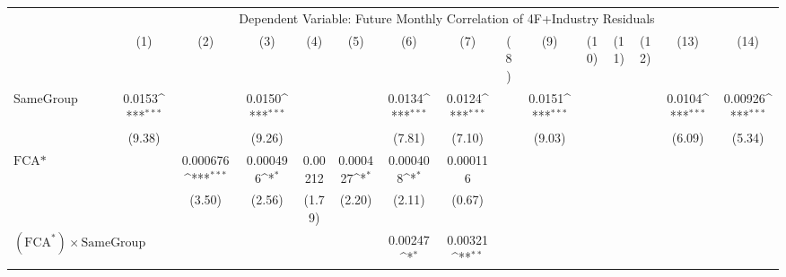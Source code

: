 {
\def\sym#1{\ifmmode^{#1}\else\(^{#1}\)\fi}
\begin{tabular}{l*{14}{c}}
\hline\hline
                &\multicolumn{14}{c}{Dependent Variable: Future Monthly Correlation of 4F+Industry Residuals}                                                                                                                                                                             \\\cmidrule(lr){2-15}
                &\multicolumn{1}{c}{(1)}         &\multicolumn{1}{c}{(2)}         &\multicolumn{1}{c}{(3)}         &\multicolumn{1}{c}{(4)}         &\multicolumn{1}{c}{(5)}         &\multicolumn{1}{c}{(6)}         &\multicolumn{1}{c}{(7)}         &\multicolumn{1}{c}{(8)}         &\multicolumn{1}{c}{(9)}         &\multicolumn{1}{c}{(10)}         &\multicolumn{1}{c}{(11)}         &\multicolumn{1}{c}{(12)}         &\multicolumn{1}{c}{(13)}         &\multicolumn{1}{c}{(14)}         \\
\hline
SameGroup       &   0.0153\sym{***}&                  &   0.0150\sym{***}&                  &                  &   0.0134\sym{***}&   0.0124\sym{***}&                  &   0.0151\sym{***}&                  &                  &                  &   0.0104\sym{***}&  0.00926\sym{***}\\
                &   (9.38)         &                  &   (9.26)         &                  &                  &   (7.81)         &   (7.10)         &                  &   (9.03)         &                  &                  &                  &   (6.09)         &   (5.34)         \\
[1em]
$ \text{FCA*} $ &                  & 0.000676\sym{***}& 0.000496\sym{*}  &  0.00212         & 0.000427\sym{*}  & 0.000408\sym{*}  & 0.000116         &                  &                  &                  &                  &                  &                  &                  \\
                &                  &   (3.50)         &   (2.56)         &   (1.79)         &   (2.20)         &   (2.11)         &   (0.67)         &                  &                  &                  &                  &                  &                  &                  \\
[1em]
 $ (\text{FCA}^*) \times {\text{SameGroup} }  $ &                  &                  &                  &                  &                  &  0.00247\sym{*}  &  0.00321\sym{**} &                  &                  &                  &                  &                  &                  &                  \\

\end{tabular}}
